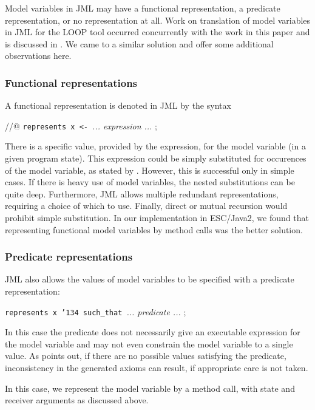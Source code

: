 \documentclass{sig-alternate}
\begin{document}
Model variables in JML may have a functional representation, a predicate representation, or 
no representation at all.  Work on translation of model variables in JML for the LOOP tool 
occurred concurrently with the work in this paper and is discussed in 
\cite{BreunessePoll03}.  We came to
a similar solution and offer some additional observations here.

\subsubsection {Functional representations}

A functional representation is denoted in JML by the syntax
\begin{center} //@ \texttt{represents x <- }{\em ... expression ... } ; \end{center}
There is a specific value, provided by the expression, for the model variable (in a given program 
state).   This expression could be simply substituted for occurences of the model variable, as
stated by \cite{BreunessePoll03}.  However, this is successful only in simple cases.  If there
is heavy use of model variables, the nested substitutions can be quite deep.  Furthermore,
JML allows multiple redundant representations, requiring a choice of which to use.  Finally,
direct or mutual recursion would prohibit simple substitution.  In our implementation in
ESC/Java2, we found that representing functional model variables by method
calls was the better
solution.

\subsubsection{Predicate representations}

JML also allows the values of model variables to be specified with a predicate representation:
\begin{center} \texttt{represents x \char'134 such\_that }{\em ... predicate ... } ; \end{center}
In this case the predicate does not necessarily give an executable expression for the
model variable and may not even constrain the model variable to a single value.  As
\cite{BreunessePoll03} points out, if there are no possible values satisfying the predicate, 
inconsistency in the generated axioms can result, if appropriate care is not taken.

In this case, we represent the model variable by a method call, with state and receiver arguments
as discussed above.
\end{document}

